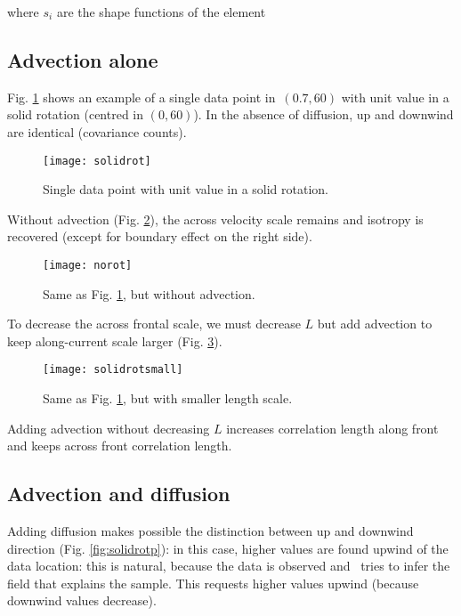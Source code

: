 where $s_i$ are the shape functions of the element



\subsection{Advection alone}

Fig. \ref{fig:solidrot} shows an example of a single data point in\, $(0.7,60)$ with unit value in a solid 
rotation (centred in $(0,60)$). In the absence of diffusion, up and downwind are identical (covariance 
counts).

\begin{figure}[H]
\parbox{.6\textwidth}{
\texttt{[image: solidrot]}
}\parbox{.4\textwidth}{
\caption{Single data point with unit value in a solid 
rotation. \label{fig:solidrot}}
}
\end{figure}


Without advection (Fig. \ref{fig:norot}), the across velocity scale remains and isotropy is 
recovered (except for boundary effect on the right side).

\begin{figure}[H]
\parbox{.6\textwidth}{
\texttt{[image: norot]}
}\parbox{.4\textwidth}{
\caption{Same as Fig. \ref{fig:solidrot}, but without advection. \label{fig:norot}}
}
\end{figure}



To decrease the across frontal scale, we must decrease $L$ but add advection 
to keep along-current scale larger (Fig. \ref{fig:solidrotsmall}).

\begin{figure}[H]
\parbox{.6\textwidth}{
\texttt{[image: solidrotsmall]}
}\parbox{.4\textwidth}{
\caption{Same as Fig. \ref{fig:solidrot}, but with smaller length scale. \label{fig:solidrotsmall}}
}
\end{figure}


Adding advection without decreasing $L$ increases correlation length 
along front and keeps across front correlation length.

\subsection{Advection and diffusion}

Adding diffusion makes possible the distinction between up and downwind 
direction (Fig. \ref{fig:solidrotp}): in this case, higher values are found upwind of the data 
location: this is natural, because the data is observed and \diva\, tries to 
infer the field that explains the sample. This requests higher values 
upwind (because downwind values decrease).

